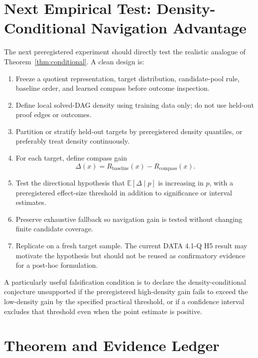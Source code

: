 \documentclass[11pt]{article}
\newcommand{\E}{\mathbb{E}}
\begin{document}
\section{Next Empirical Test: Density-Conditional Navigation Advantage}

The next preregistered experiment should directly test the realistic analogue of Theorem~\ref{thm:conditional}. A clean design is:

\begin{enumerate}[leftmargin=2.1em]
\item Freeze a quotient representation, target distribution, candidate-pool rule, baseline order, and learned compass before outcome inspection.
\item Define local solved-DAG density using training data only; do not use held-out proof edges or outcomes.
\item Partition or stratify held-out targets by preregistered density quantiles, or preferably treat density continuously.
\item For each target, define compass gain
\[
\Delta(x)=R_{\mathrm{baseline}}(x)-R_{\mathrm{compass}}(x).
\]
\item Test the directional hypothesis that $\E[\Delta\mid p]$ is increasing in $p$, with a preregistered effect-size threshold in addition to significance or interval estimates.
\item Preserve exhaustive fallback so navigation gain is tested without changing finite candidate coverage.
\item Replicate on a fresh target sample. The current DATA 4.1-Q H5 result may motivate the hypothesis but should not be reused as confirmatory evidence for a post-hoc formulation.
\end{enumerate}

A particularly useful falsification condition is to declare the density-conditional conjecture unsupported if the preregistered high-density gain fails to exceed the low-density gain by the specified practical threshold, or if a confidence interval excludes that threshold even when the point estimate is positive.

\section{Theorem and Evidence Ledger}
\end{document}
